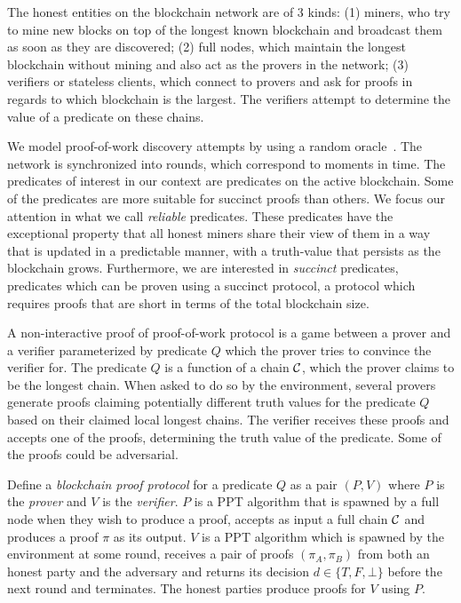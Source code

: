 The honest entities on the blockchain network are of 3 kinds: (1) miners, who
try to mine new blocks on top of the longest known blockchain and broadcast them
as soon as they are discovered; (2) full nodes, which maintain the longest
blockchain without mining and also act as the provers in the network; (3)
verifiers or stateless clients, which connect to provers and ask for proofs in
regards to which blockchain is the largest. The verifiers attempt to determine
the value of a predicate on these chains.

We model proof-of-work discovery attempts by using a random oracle~\cite{RO}.
The network is synchronized into rounds, which correspond to moments in time.
The predicates of interest in our context are predicates on the active
blockchain. Some of the predicates are more suitable for succinct proofs than
others. We focus our attention in what we call \textit{reliable} predicates.
These predicates have the exceptional property that all honest miners share
their view of them in a way that is updated in a predictable manner, with a
truth-value that persists as the blockchain grows.  Furthermore, we are
interested in \textit{succinct} predicates, predicates which can be proven using
a succinct protocol, a protocol which requires proofs that are short in terms of
the total blockchain size.

A non-interactive proof of proof-of-work protocol is a game between a prover and
a verifier parameterized by predicate $Q$ which the prover tries to convince the
verifier for. The predicate $Q$ is a function of a chain $\mathcal{C}$, which the
prover claims to be the longest chain. When asked to do so by the environment,
several provers generate proofs claiming potentially different truth values for
the predicate $Q$ based on their claimed local longest chains. The verifier
receives these proofs and accepts one of the proofs, determining the truth value
of the predicate. Some of the proofs could be adversarial.

Define a \textit{blockchain proof protocol} for a predicate $Q$ as a pair $(P,
V)$ where $P$ is the \textit{prover} and $V$ is the \textit{verifier}. $P$ is a
PPT algorithm that is spawned by a full node when they wish to produce a proof,
accepts as input a full chain $\mathcal{C}$ and produces a proof $\pi$ as its output.
$V$ is a PPT algorithm which is spawned by the environment at some round,
receives a pair of proofs $(\pi_A, \pi_B)$ from both an honest party and the
adversary and returns its decision $d \in \{T, F, \bot\}$ before the next round
and terminates. The honest parties produce proofs for $V$ using $P$.

